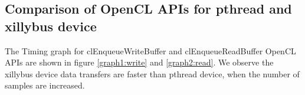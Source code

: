 \subsection{Comparison of OpenCL APIs for pthread and xillybus device}
The Timing graph for clEnqueueWriteBuffer and clEnqueueReadBuffer OpenCL APIs are shown in figure \ref{graph1:write} and \ref{graph2:read}. We observe the xillybus device data transfers are faster than pthread device, when the number of samples are increased.

